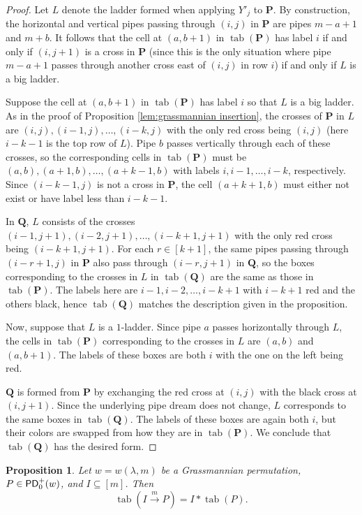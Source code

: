 \documentclass[11pt,reqno]{amsart} %
\newcommand{\bfP}{\mathbf{P}}
\newcommand{\bfQ}{\mathbf{Q}}
\newcommand{\sseq}{\subseteq}
\newcommand{\msert}{\overset{m}{\rightarrow}}
\DeclareMathOperator{\PD}{\sf{PD}}
\DeclareMathOperator{\tab}{tab}
\newtheorem{proposition}[theorem]{Proposition}
\theoremstyle{definition}
\begin{document}
\begin{proof}
Let $L$ denote the ladder formed when applying $Y'_j$ to $\bfP$.
By construction, the horizontal and vertical pipes passing through $(i,j)$ in $\bfP$ are pipes $m-a+1$ and $m+b$.
It follows that the cell at $(a,b+1)$ in $\tab(\bfP)$ has label $i$ if and only if $(i,j+1)$ is a cross in $\bfP$ (since this is the only situation where pipe $m-a+1$ passes through another cross east of $(i,j)$ in row $i$) if and only if $L$ is a big ladder.

Suppose the cell at $(a,b+1)$ in $\tab(\bfP)$ has label $i$ so that $L$ is a big ladder.
As in the proof of Proposition \ref{lem:grassmannian insertion}, the crosses of $\bfP$ in $L$ are $(i,j),(i-1,j),\dots,(i-k,j)$ with the only red cross being $(i,j)$ (here $i-k-1$ is the top row of $L$).
Pipe $b$ passes vertically through each of these crosses, so the corresponding cells in $\tab(\bfP)$ must be $(a,b),(a+1,b),\dots,(a+k-1,b)$ with labels $i,i-1,\dots,i-k$, respectively.
Since $(i-k-1,j)$ is not a cross in $\bfP$, the cell $(a+k+1,b)$ must either not exist or have label less than $i-k-1$.

In $\bfQ$, $L$ consists of the crosses $(i-1,j+1),(i-2,j+1),\dots,(i-k+1,j+1)$ with the only red cross being $(i-k+1,j+1)$.
For each $r\in [k+1]$, the same pipes passing through $(i-r+1,j)$ in $\bfP$ also pass through $(i-r,j+1)$ in $\bfQ$, so the boxes corresponding to the crosses in $L$ in $\tab(\bfQ)$ are the same as those in $\tab(\bfP)$.
The labels here are $i-1,i-2,\dots,i-k+1$ with $i-k+1$ red and the others black, hence $\tab(\bfQ)$ matches the description given in the proposition.

Now, suppose that $L$ is a $1$-ladder.
Since pipe $a$ passes horizontally through $L$, the cells in $\tab(\bfP)$ corresponding to the crosses in $L$ are $(a,b)$ and $(a,b+1)$.
The labels of these boxes are both $i$ with the one on the left being red.

$\bfQ$ is formed from $\bfP$ by exchanging the red cross at $(i,j)$ with the black cross at $(i,j+1)$.
Since the underlying pipe dream does not change, $L$ corresponds to the same boxes in $\tab(\bfQ)$.
The labels of these boxes are again both $i$, but their colors are swapped from how they are in $\tab(\bfP)$.
We conclude that $\tab(\bfQ)$ has the desired form.
\end{proof}



\begin{proposition}
\label{prop:insertion agrees}
Let $w = w(\lambda,m)$ be a Grassmannian permutation, $P\in \PD_0^+(w)$, and $I\sseq [m]$.
Then \[
    \tab(I\msert P) = I * \tab(P).
\]
\end{proposition}
\end{document}
